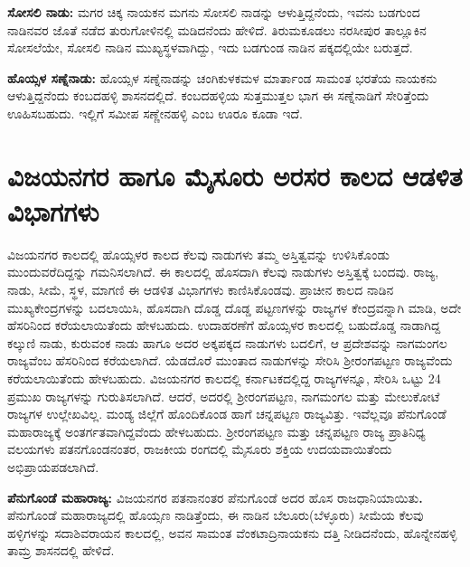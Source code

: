 \textbf{ಸೋಸಲಿ ನಾಡು:} ಮಗರ ಚಿಕ್ಕ ನಾಯಕನ ಮಗನು ಸೋಸಲಿ ನಾಡನ್ನು ಆಳುತ್ತಿದ್ದನೆಂದು, ಇವನು ಬಡಗುಂದ ನಾಡಿನವರ ಜೊತೆ ನಡೆದ ತುರುಗೋಳಿನಲ್ಲಿ ಮಡಿದನೆಂದು ಹೇಳಿದೆ. ತಿರುಮಕೂಡಲು ನರಸೀಪುರ ತಾಲ್ಲೂಕಿನ ಸೋಸಲೆಯೇ, ಸೋಸಲಿ ನಾಡಿನ ಮುಖ್ಯಸ್ಥಳವಾಗಿದ್ದು, ಇದು ಬಡಗುಂಡ ನಾಡಿನ ಪಕ್ಕದಲ್ಲಿಯೇ ಬರುತ್ತದೆ.

\textbf{ಹೊಯ್ಸಳ ಸಣ್ನೆನಾಡು:} ಹೊಯ್ಸಳ ಸಣ್ನೆನಾಡನ್ನು ಚಂಗಿಕುಳಕಮಳ ಮಾರ್ತಾಂಡ ಸಾಮಂತ ಭರತೆಯ ನಾಯಕನು ಆಳುತ್ತಿದ್ದನೆಂದು ಕಂಬದಹಳ್ಳಿ ಶಾಸನದಲ್ಲಿದೆ. ಕಂಬದಹಳ್ಳಿಯ ಸುತ್ತಮುತ್ತಲ ಭಾಗ ಈ ಸಣ್ನೆನಾಡಿಗೆ ಸೇರಿತ್ತೆಂದು ಊಹಿಸಬಹುದು. ಇಲ್ಲಿಗೆ ಸಮೀಪ ಸಣ್ಣೇನಹಳ್ಳಿ ಎಂಬ ಊರೂ ಕೂಡಾ ಇದೆ.


\section{ವಿಜಯನಗರ ಹಾಗೂ ಮೈಸೂರು ಅರಸರ ಕಾಲದ ಆಡಳಿತ ವಿಭಾಗಗಳು}

\vskip -4pt

ವಿಜಯನಗರ ಕಾಲದಲ್ಲಿ ಹೊಯ್ಸಳರ ಕಾಲದ ಕೆಲವು ನಾಡುಗಳು ತಮ್ಮ ಅಸ್ತಿತ್ವವನ್ನು ಉಳಿಸಿಕೊಂಡು ಮುಂದುವರೆದಿದ್ದನ್ನು ಗಮನಿಸಲಾಗಿದೆ. ಈ ಕಾಲದಲ್ಲಿ ಹೊಸದಾಗಿ ಕೆಲವು ನಾಡುಗಳು ಅಸ್ತಿತ್ವಕ್ಕೆ ಬಂದವು. ರಾಜ್ಯ, ನಾಡು, ಸೀಮೆ, ಸ್ಥಳ, ಮಾಗಣಿ ಈ ಆಡಳಿತ ವಿಭಾಗಗಳು ಕಾಣಿಸಿಕೊಂಡವು. ಪ್ರಾಚೀನ ಕಾಲದ ನಾಡಿನ ಮುಖ್ಯಕೇಂದ್ರಗಳನ್ನು ಬದಲಾಯಿಸಿ, ಹೊಸದಾಗಿ ದೊಡ್ಡ ದೊಡ್ಡ ಪಟ್ಟಣಗಳನ್ನು ರಾಜ್ಯಗಳ ಕೇಂದ್ರವನ್ನಾಗಿ ಮಾಡಿ, ಅದೇ ಹೆಸರಿನಿಂದ ಕರೆಯಲಾಯಿತೆಂದು ಹೇಳಬಹುದು. ಉದಾಹರಣೆಗೆ ಹೊಯ್ಸಳರ ಕಾಲದಲ್ಲಿ ಬಹುದೊಡ್ಡ ನಾಡಾಗಿದ್ದ ಕಲ್ಕುಣಿ ನಾಡು, ಕುರುವಂಕ ನಾಡು ಹಾಗೂ ಅದರ ಅಕ್ಕಪಕ್ಕದ ನಾಡುಗಳು ಬದಲಿಗೆ, ಆ ಪ್ರದೇಶವನ್ನು ನಾಗಮಂಗಲ ರಾಜ್ಯವೆಂಬ ಹೆಸರಿನಿಂದ ಕರೆಯಲಾಗಿದೆ. ಯೆಡದೊರೆ ಮುಂತಾದ ನಾಡುಗಳನ್ನು ಸೇರಿಸಿ ಶ‍್ರೀರಂಗಪಟ್ಟಣ ರಾಜ್ಯವೆಂದು ಕರೆಯಲಾಯಿತೆಂದು ಹೇಳಬಹುದು. ವಿಜಯನಗರ ಕಾಲದಲ್ಲಿ ಕರ್ನಾಟಕದಲ್ಲಿದ್ದ ರಾಜ್ಯಗಳನ್ನೂ, ಸೇರಿಸಿ ಒಟ್ಟು 24 ಪ್ರಮುಖ ರಾಜ್ಯಗಳನ್ನು ಗುರುತಿಸಲಾಗಿದೆ. ಆದರೆ, ಅದರಲ್ಲಿ ಶ‍್ರೀರಂಗಪಟ್ಟಣ, ನಾಗಮಂಗಲ ಮತ್ತು ಮೇಲುಕೋಟೆ ರಾಜ್ಯಗಳ ಉಲ್ಲೇಖವಿಲ್ಲ. ಮಂಡ್ಯ ಜಿಲ್ಲೆಗೆ ಹೊಂದಿಕೊಂಡ ಹಾಗೆ ಚನ್ನಪಟ್ಟಣ ರಾಜ್ಯವಿತ್ತು. ಇವೆಲ್ಲವೂ ಪೆನುಗೊಂಡೆ ಮಹಾರಾಜ್ಯಕ್ಕೆ ಅಂತರ್ಗತವಾಗಿದ್ದವೆಂದು ಹೇಳಬಹುದು. ಶ‍್ರೀರಂಗಪಟ್ಟಣ ಮತ್ತು ಚನ್ನಪಟ್ಟಣ ರಾಜ್ಯ ಪ್ರಾತಿನಿಧ್ಯ ವಲಯಗಳು ಪತನಗೊಂಡನಂತರ, ರಾಜಕೀಯ ರಂಗದಲ್ಲಿ ಮೈಸೂರು ಶಕ್ತಿಯ ಉದಯವಾಯಿತೆಂದು ಅಭಿಪ್ರಾಯಪಡಲಾಗಿದೆ.

\textbf{ಪೆನುಗೊಂಡೆ ಮಹಾರಾಜ್ಯ:} ವಿಜಯನಗರ ಪತನಾನಂತರ ಪೆನುಗೊಂಡೆ ಅದರ ಹೊಸ ರಾಜಧಾನಿಯಾಯಿತು\textbf{. }ಪೆನುಗೊಂಡೆ ಮಹಾರಾಜ್ಯದಲ್ಲಿ ಹೊಯ್ಸಣ ನಾಡಿತ್ತೆಂದು, ಈ ನಾಡಿನ ಬೆಲೂರು(ಬೆಳ್ಳೂರು) ಸೀಮೆಯ ಕೆಲವು ಹಳ್ಳಿಗಳನ್ನು ಸದಾಶಿವರಾಯನ ಕಾಲದಲ್ಲಿ, ಅವನ ಸಾಮಂತ ವೆಂಕಟಾದ್ರಿನಾಯಕನು ದತ್ತಿ ನೀಡಿದನೆಂದು, ಹೊನ್ನೇನಹಳ್ಳಿ ತಾಮ್ರ ಶಾಸನದಲ್ಲಿ ಹೇಳಿದೆ.

\newpage

